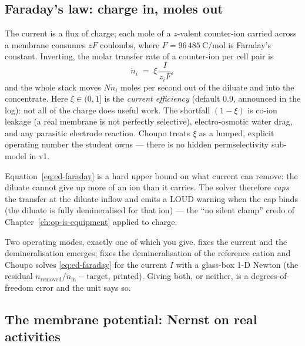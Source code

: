 \documentclass[11pt,a4paper]{article}
\begin{document}
\subsection{Faraday's law: charge in, moles out}

The current is a flux of charge; each mole of a $z$-valent counter-ion
carried across a membrane consumes $zF$ coulombs, where
$F = 96\,485\ \mathrm{C/mol}$ is Faraday's constant.  Inverting, the
molar transfer rate of a counter-ion per cell pair is
%
\begin{equation}
  \dot n_i \;=\; \xi\,\frac{I}{z_i F},
  \label{eq:ed-faraday}
\end{equation}
%
and the whole stack moves $N\dot n_i$ moles per second out of the diluate
and into the concentrate.  Here $\xi \in (0,1]$ is the \emph{current
efficiency} (default $0.9$, announced in the log): not all of the charge
does useful work.  The shortfall $(1-\xi)$ is co-ion leakage (a real
membrane is not perfectly selective), electro-osmotic water drag, and any
parasitic electrode reaction.  Choupo treats $\xi$ as a lumped, explicit
operating number the student owns --- there is no hidden permselectivity
sub-model in v1.

Equation~\eqref{eq:ed-faraday} is a hard upper bound on what current can
remove: the diluate cannot give up more of an ion than it carries.  The
solver therefore \emph{caps} the transfer at the diluate inflow and emits
a LOUD warning when the cap binds (the diluate is fully demineralised for
that ion) --- the ``no silent clamp'' credo of
Chapter~\ref{ch:op-is-equipment} applied to charge.

\begin{keyidea}
Two operating modes, exactly one of which you give.
 fixes the current and the demineralisation
emerges;  fixes the demineralisation of
the reference cation and Choupo solves \eqref{eq:ed-faraday} for the
current $I$ with a glass-box 1-D Newton (the residual
$\dot n_\text{removed}/\dot n_\text{in} - \text{target}$, printed). Giving
both, or neither, is a degrees-of-freedom error and the unit says so.
\end{keyidea}

\subsection{The membrane potential: Nernst on real activities}
\end{document}
